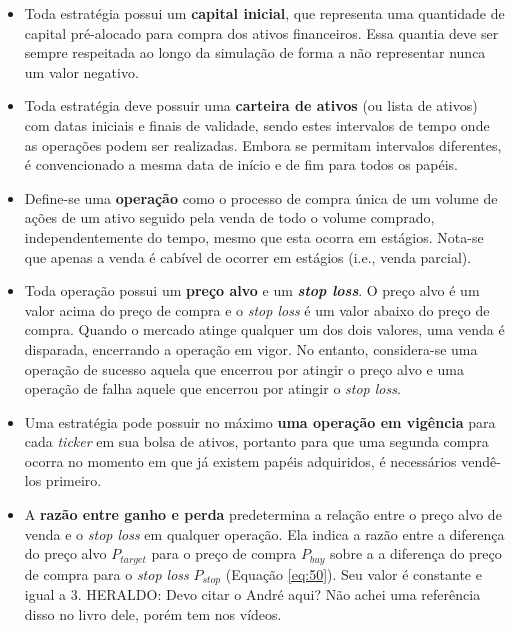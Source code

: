 \begin{itemize}
    \item Toda estratégia possui um \textbf{capital inicial}, que representa uma quantidade de capital pré-alocado para compra dos ativos financeiros. Essa quantia deve ser sempre respeitada ao longo da simulação de forma a não representar nunca um valor negativo.

    \item Toda estratégia deve possuir uma \textbf{carteira de ativos} (ou lista de ativos) com datas iniciais e finais de validade, sendo estes intervalos de tempo onde as operações podem ser realizadas. Embora se permitam intervalos diferentes, é convencionado a mesma data de início e de fim para todos os papéis.

    \item Define-se uma  \textbf{operação} como o processo de compra única de um volume de ações de um ativo seguido pela venda de todo o volume comprado, independentemente do tempo, mesmo que esta ocorra em estágios. Nota-se que apenas a venda é cabível de ocorrer em estágios (i.e., venda parcial).

    \item Toda operação possui um \textbf{preço alvo} e um \textbf{\textit{stop loss}}. O preço alvo é um valor acima do preço de compra e o \textit{stop loss} é um valor abaixo do preço de compra. Quando o mercado atinge qualquer um dos dois valores, uma venda é disparada, encerrando a operação em vigor. No entanto, considera-se uma operação de sucesso aquela que encerrou por atingir o preço alvo e uma operação de falha aquele que encerrou por atingir o \textit{stop loss}.

    \item Uma estratégia pode possuir no máximo  \textbf{uma operação em vigência} para cada \textit{ticker} em sua bolsa de ativos, portanto para que uma segunda compra ocorra no momento em que já existem papéis adquiridos, é necessários vendê-los primeiro.

    \item A \textbf{razão entre ganho e perda} predetermina a relação entre o preço alvo de venda e o \textit{stop loss} em qualquer operação. Ela indica a razão entre a diferença do preço alvo \begin{math} P_{target} \end{math} para o preço de compra \begin{math} P_{buy} \end{math} sobre a a diferença do preço de compra para o \textit{stop loss} \begin{math} P_{stop} \end{math} (Equação \ref{eq:50}). Seu valor é constante e igual a 3. \color{red} HERALDO: Devo citar o André aqui? Não achei uma referência disso no livro dele, porém tem nos vídeos. 


\end{itemize}

